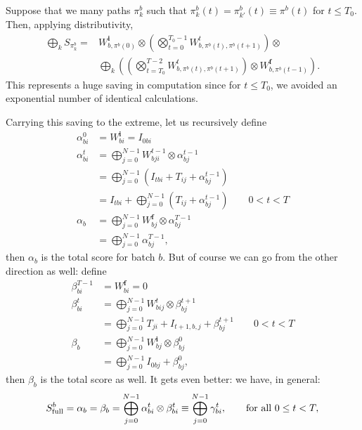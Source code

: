 \documentclass[a4paper]{article}
\begin{document}
Suppose that we many paths $\pi^b_k$ such that $\pi_k^b(t) = \pi^b_{k'}(t) \equiv \pi^b(t)$ for $t\leq T_0$. Then, applying distributivity,
\begin{align}
\bigoplus_k S_{\pi^b_k} =& W^{\mathbf{i}}_{b,\pi^b(0)} \otimes \left(\bigotimes_{t=0}^{T_0-1}W^t_{b,\pi^b(t),\pi^b(t+1)}\right)\otimes \\
 &  \bigoplus_k\left(\left(\bigotimes_{t=T_0}^{T-2}W^t_{b,\pi^b(t),\pi^b(t+1)}\right)\otimes  W^{\mathbf{f}}_{b,\pi^b(t-1)}\right).
\end{align}
This represents a huge saving in computation since for $t\leq T_0$, we avoided an exponential number of identical calculations.

Carrying this saving to the extreme, let us recursively define
\begin{align}
\alpha^0_{bi} &= W^{\mathbf{i}}_{bi} =I_{0bi} \\
\label{eq::alpha_mat_prod}
\alpha^t_{bi} &= \bigoplus_{j=0}^{N-1} W^{t-1}_{bji}\otimes \alpha^{t-1}_{bj} \\
&= \bigoplus_{j=0}^{N-1} (I_{tbi} + T_{ij} + \alpha^{t-1}_{bj})\\
&= I_{tbi} + \bigoplus_{j=0}^{N-1} (T_{ij} + \alpha^{t-1}_{bj}) \qquad 0 < t < T \\
\alpha_b &= \bigoplus_{j=0}^{N-1} W^{\mathbf{f}}_{bj} \otimes \alpha^{T-1}_{bj}\\
&= \bigoplus_{j=0}^{N-1} \alpha^{T-1}_{bj},
\end{align}
then $\alpha_b$ is the total score for batch $b$. But of course we can go from the other direction as well: define
\begin{align}
\beta^{T-1}_{bi} &= W^{\mathbf{f}}_{bi} = 0 \\
\label{eq::beta_mat_prod}
\beta^{t}_{bi} &= \bigoplus_{j=0}^{N-1}W^{t}_{bij}\otimes \beta^{t+1}_{bj} \\
&= \bigoplus_{j=0}^{N-1} T_{ji} + I_{t+1,b,j} + \beta^{t+1}_{bj} \qquad 0 < t < T\\
\beta_{b} &= \bigoplus_{j=0}^{N-1}W^{\mathbf{i}}_{bj}\otimes \beta^{0}_{bj} \\
&= \bigoplus_{j=0}^{N-1}I_{0bj}+ \beta^{0}_{bj},
\end{align}
then $\beta_b$ is the total score as well. It gets even better: we have, in general:
\begin{equation}
S^b_{\rm{full}} = \alpha_b = \beta_b = \bigoplus_{j=0}^{N-1}\alpha^t_{bi}\otimes \beta^t_{bi}\equiv  \bigoplus_{j=0}^{N-1}\gamma^t_{bi},\qquad \textrm{for all } 0 \leq t < T,
\end{equation}
\end{document}
